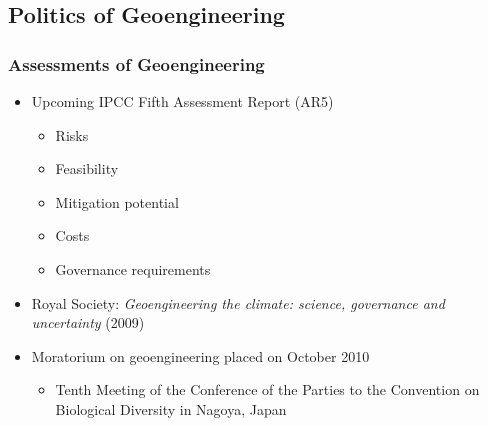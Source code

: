 \documentclass{beamer}
\begin{document}
\subsection{Politics of Geoengineering}
\begin{frame}
\frametitle{Assessments of Geoengineering}
\begin{itemize}
\item Upcoming IPCC Fifth Assessment Report (AR5)
\begin{itemize}
	\item Risks
	\item Feasibility
	\item Mitigation potential
	\item Costs 
	\item Governance requirements
\end{itemize}
\item Royal Society: \emph{Geoengineering the climate: science, governance and uncertainty} (2009)
\item Moratorium on geoengineering placed on October 2010
\begin{itemize}
	\item Tenth Meeting of the Conference of the Parties to the Convention on Biological Diversity in Nagoya, Japan
\end{itemize}
\end{itemize}
\end{frame}
\end{document}
